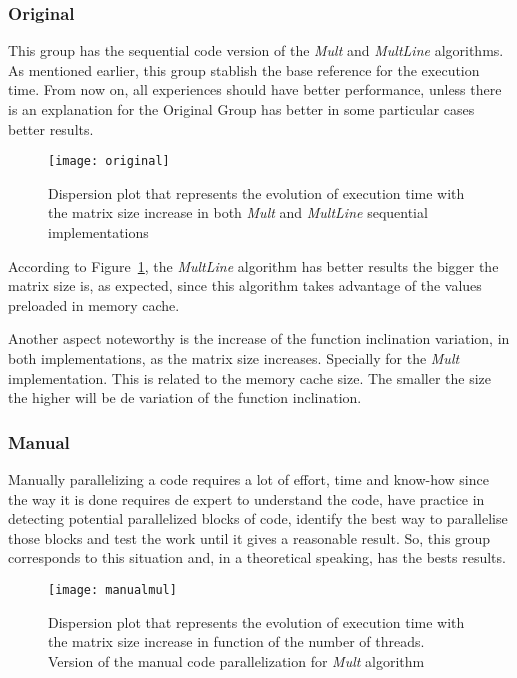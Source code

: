 \subsubsection{Original}

This group has the sequential code version of the \textit{Mult} and \textit{MultLine} algorithms. As mentioned earlier, this group stablish the base reference for the execution time. From now on, all experiences should have better performance, unless there is an explanation for the Original Group has better in some particular cases better results.

\begin{figure}[htb]
	\begin{center}
		\leavevmode
		\texttt{[image: original]}
		\caption{Dispersion plot that represents the evolution of execution time with the matrix size increase in both \textit{Mult} and \textit{MultLine} sequential implementations}
		\label{fig:original}
	\end{center}
\end{figure}

According to Figure~\ref{fig:original}, the \textit{MultLine} algorithm has better results the bigger the matrix size is, as expected, since this algorithm takes advantage of the values preloaded in memory cache.

Another aspect noteworthy is the increase of the function inclination variation, in both implementations, as the matrix size increases. Specially for the  \textit{Mult} implementation. This is related to the memory cache size. The smaller the size the higher will be de variation of the function inclination.

\subsubsection{Manual}\label{subsubsec:manual}

Manually parallelizing a code requires a lot of effort, time and know-how since the way it is done requires de expert to understand the code, have practice in detecting potential parallelized blocks of code, identify the best way to parallelise those blocks and test the work until it gives a reasonable result.
So, this group corresponds to this situation and, in a theoretical speaking, has the bests results. 

\begin{figure}[htb]
	\begin{center}
		\leavevmode
		\texttt{[image: manualmul]}
		\caption{Dispersion plot that represents the evolution of execution time with the matrix size increase in function of the number of threads. Version of the manual code parallelization for \textsl{Mult} algorithm}
		\label{fig:manualmul}
	\end{center}
\end{figure}

